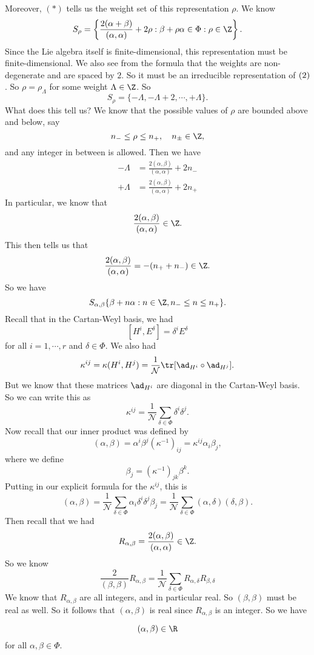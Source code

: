 \documentclass[a4paper]{article}
\begin{document}
Moreover, $(*)$ tells us the weight set of this representation $\rho$. We know
\[
  S_\rho = \left\{ \frac{2(\alpha + \beta)}{(\alpha, \alpha)} + 2\rho: \beta + \rho \alpha \in \Phi: \rho \in \Z\right\}.
\]
Since the Lie algebra itself is finite-dimensional, this representation must be finite-dimensional. We also see from the formula that the weights are non-degenerate and are spaced by $2$. So it must be an irreducible representation of $\sl(2)$. So $\rho = \rho_\Lambda$ for some weight $\Lambda \in \Z$. So
\[
  S_\rho = \{-\Lambda, -\Lambda + 2, \cdots, +\Lambda\}.
\]
What does this tell us? We know that the possible values of $\rho$ are bounded above and below, say
\[
  n_- \leq \rho \leq n_+, \quad n_{\pm} \in \Z,
\]
and any integer in between is allowed. Then we have
\begin{align*}
  -\Lambda &= \frac{2(\alpha, \beta)}{(\alpha, \alpha)} + 2n_-\\
  +\Lambda &= \frac{2(\alpha, \beta)}{(\alpha, \alpha)} + 2n_+
\end{align*}
In particular, we know that
\[
  \frac{2(\alpha, \beta)}{(\alpha,\alpha)} \in \Z.
\]
This then tells us that
\[
  \frac{2(\alpha, \beta)}{(\alpha, \alpha)} = - (n_+ + n_-) \in \Z.
\]
So we have
\[
  S_{\alpha, \beta} \{\beta + n \alpha: n \in \Z, n_- \leq n \leq n_+\}.
\]
Recall that in the Cartan-Weyl basis, we had
\[
  [H^i, E^\delta] = \delta^i E^\delta
\]
for all $i = 1, \cdots, r$ and $\delta \in \Phi$. We also had
\[
  \kappa^{ij} = \kappa(H^i, H^j) = \frac{1}{\mathcal{N}} \tr [\ad_{H^i} \circ \ad_{H^j}].
\]
But we know that these matrices $\ad_{H^i}$ are diagonal in the Cartan-Weyl basis. So we can write this as
\[
  \kappa^{ij} = \frac{1}{\mathcal{N}} \sum_{\delta \in \Phi} \delta^i \delta^j.
\]
Now recall that our inner product was defined by
\[
  (\alpha, \beta) = \alpha^i \beta^j (\kappa^{-1})_{ij} = \kappa^{ij} \alpha_i \beta_j,
\]
where we define
\[
  \beta_j = (\kappa^{-1})_{jk} \beta^k.
\]
Putting in our explicit formula for the $\kappa^{ij}$, this is
\[
  (\alpha, \beta) = \frac{1}{\mathcal{N}}\sum_{\delta \in \Phi} \alpha_i \delta^i \delta^j \beta_j = \frac{1}{\mathcal{N}}\sum_{\delta \in \Phi}(\alpha, \delta) (\delta, \beta).
\]
Then recall that we had
\[
  R_{\alpha, \beta} = \frac{2(\alpha, \beta)}{(\alpha, \alpha)} \in \Z.
\]
So we know
\[
  \frac{2}{(\beta, \beta)} R_{\alpha, \beta} = \frac{1}{\mathcal{N}} \sum_{\delta \in \Phi} R_{\alpha, \delta} R_{\beta, \delta}
\]
We know that $R_{\alpha, \beta}$ are all integers, and in particular real. So $(\beta, \beta)$ must be real as well. So it follows that $(\alpha, \beta)$ is real since $R_{\alpha, \beta}$ is an integer. So we have
\begin{thm}
  \[
    (\alpha, \beta) \in \R
  \]
  for all $\alpha, \beta \in \Phi$.
\end{thm}
\end{document}
